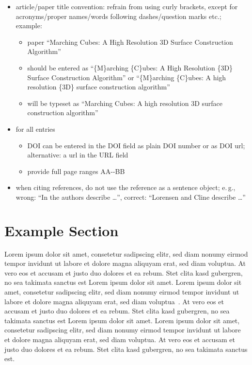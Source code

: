\documentclass{vgtc}                          %
\begin{document}
\begin{itemize}
\begin{itemize}
  \end{itemize}
\item article/paper title convention: refrain from using curly brackets, except for acronyms/proper names/words following dashes/question marks etc.; example:
\begin{itemize}
	\item paper ``Marching Cubes: A High Resolution 3D Surface Construction Algorithm''
	\item should be entered as ``\{M\}arching \{C\}ubes: A High Resolution \{3D\} Surface Construction Algorithm'' or  ``\{M\}arching \{C\}ubes: A high resolution \{3D\} surface construction algorithm''
	\item will be typeset as ``Marching Cubes: A high resolution 3D surface construction algorithm''
\end{itemize}
\item for all entries
\begin{itemize}
	\item DOI can be entered in the DOI field as plain DOI number or as DOI url; alternative: a url in the URL field
	\item provide full page ranges AA-{}-BB
\end{itemize}
\item when citing references, do not use the reference as a sentence object; e.\,g., wrong: ``In \cite{Lorensen:1987:MCA} the authors describe \dots'', correct: ``Lorensen and Cline \cite{Lorensen:1987:MCA} describe \dots''
\end{itemize}

\section{Example Section}

Lorem ipsum dolor sit amet, consetetur sadipscing elitr, sed diam
nonumy eirmod tempor invidunt ut labore et dolore magna aliquyam erat,
sed diam voluptua. At vero eos et accusam et justo duo dolores et ea
rebum. Stet clita kasd gubergren, no sea takimata sanctus est Lorem
ipsum dolor sit amet. Lorem ipsum dolor sit amet, consetetur
sadipscing elitr, sed diam nonumy eirmod tempor invidunt ut labore et
dolore magna aliquyam erat, sed diam
voluptua~\cite{Kitware:2003,Max:1995:OMF}. At vero eos et accusam et
justo duo dolores et ea rebum. Stet clita kasd gubergren, no sea
takimata sanctus est Lorem ipsum dolor sit amet. Lorem ipsum dolor sit
amet, consetetur sadipscing elitr, sed diam nonumy eirmod tempor
invidunt ut labore et dolore magna aliquyam erat, sed diam
voluptua. At vero eos et accusam et justo duo dolores et ea
rebum. Stet clita kasd gubergren, no sea takimata sanctus est.
\end{document}
